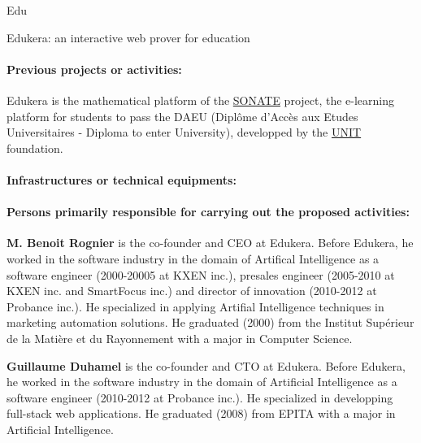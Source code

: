 \begin{sitedescription}{Edu}
\begin{compactitem}
    \item Edukera: an interactive web prover for education
\end{compactitem}

\paragraph*{Previous projects or activities:}


\begin{compactitem}
\item Edukera is the mathematical platform of the \hyperlink{https://daeu-sonate.fr/}{SONATE} project, the e-learning platform for
students to pass the DAEU (Diplôme d'Accès aux Etudes Universitaires - Diploma to enter University), developped by the \hyperlink{http://www.unit.eu/}{UNIT} foundation.
\end{compactitem}

\paragraph*{Infrastructures or technical equipments:}


\paragraph*{Persons primarily responsible for carrying out the proposed activities:}

\begin{compactitem} %
\item{\bf M. Benoit Rognier} is the co-founder and CEO at Edukera.
Before Edukera, he worked in the software industry in the domain of Artifical Intelligence
as a software engineer (2000-20005 at KXEN inc.), presales engineer (2005-2010 at KXEN inc.
and SmartFocus inc.) and director of innovation (2010-2012 at Probance inc.).
He specialized in applying Artifial Intelligence techniques in marketing automation solutions.
He graduated (2000) from the Institut Supérieur de la Matière et du Rayonnement
with a major in Computer Science.

\item{\bf Guillaume Duhamel} is the co-founder and CTO at Edukera.
Before Edukera, he worked in the software industry in the domain of Artificial Intelligence
as a software engineer (2010-2012 at Probance inc.). He specialized in developping full-stack web applications.
He graduated (2008) from EPITA with a major in Artificial Intelligence.

\end{compactitem}

\end{sitedescription}

